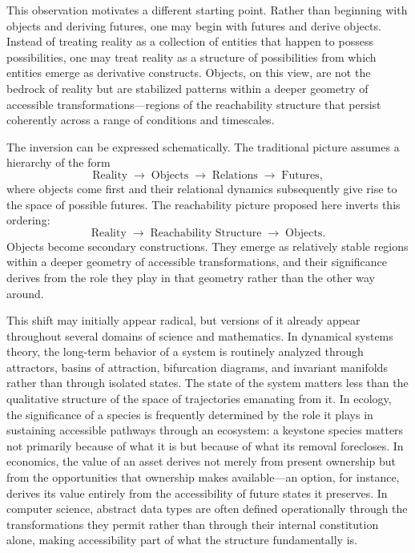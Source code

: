 \documentclass[12pt,a4paper]{article}
\theoremstyle{plain}
\theoremstyle{definition}
\theoremstyle{remark}
\begin{document}
This observation motivates a different starting point. Rather than beginning
with objects and deriving futures, one may begin with futures and derive
objects. Instead of treating reality as a collection of entities that happen
to possess possibilities, one may treat reality as a structure of
possibilities from which entities emerge as derivative constructs. Objects,
on this view, are not the bedrock of reality but are stabilized patterns
within a deeper geometry of accessible transformations---regions of the
reachability structure that persist coherently across a range of conditions
and timescales.

The inversion can be expressed schematically. The traditional picture assumes
a hierarchy of the form
\[
  \text{Reality}
  \;\rightarrow\;
  \text{Objects}
  \;\rightarrow\;
  \text{Relations}
  \;\rightarrow\;
  \text{Futures},
\]
where objects come first and their relational dynamics subsequently give rise
to the space of possible futures. The reachability picture proposed here
inverts this ordering:
\[
  \text{Reality}
  \;\rightarrow\;
  \text{Reachability Structure}
  \;\rightarrow\;
  \text{Objects}.
\]
Objects become secondary constructions. They emerge as relatively stable
regions within a deeper geometry of accessible transformations, and their
significance derives from the role they play in that geometry rather than
the other way around.

This shift may initially appear radical, but versions of it already appear
throughout several domains of science and mathematics. In dynamical systems
theory, the long-term behavior of a system is routinely analyzed through
attractors, basins of attraction, bifurcation diagrams, and invariant
manifolds rather than through isolated states. The state of the system
matters less than the qualitative structure of the space of trajectories
emanating from it. In ecology, the significance of a species is frequently
determined by the role it plays in sustaining accessible pathways through an
ecosystem: a keystone species matters not primarily because of what it is
but because of what its removal forecloses. In economics, the value of an
asset derives not merely from present ownership but from the opportunities
that ownership makes available---an option, for instance, derives its value
entirely from the accessibility of future states it preserves. In computer
science, abstract data types are often defined operationally through the
transformations they permit rather than through their internal constitution
alone, making accessibility part of what the structure fundamentally is.
\end{document}
